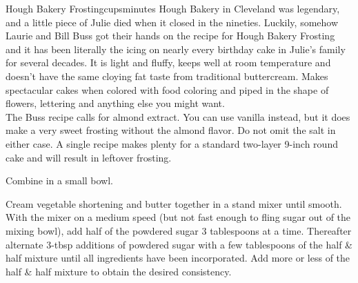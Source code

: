 \begin{recipe}{Hough Bakery Frosting}{\unit[6]{cups}}{\unit[20]{minutes}}
\freeform Hough Bakery in Cleveland was legendary, and a little piece
of Julie died when it closed in the nineties. Luckily, somehow Laurie
and Bill Buss got their hands on the recipe for Hough Bakery Frosting
and it has been literally the icing on nearly every birthday cake in
Julie's family for several decades. It is light and fluffy, keeps well
at room temperature and doesn't have the same cloying fat taste from
traditional buttercream. Makes spectacular cakes when colored with
food coloring and piped in the shape of flowers, lettering and
anything else you might want.\\

The Buss recipe calls for almond extract. You can use vanilla instead, but it does make a very sweet frosting without the almond flavor. Do not omit the salt in either case. A single recipe makes plenty for a standard two-layer 9-inch round cake and will result in leftover frosting.

Combine in a small bowl.

Cream vegetable shortening and butter together in a stand mixer until
smooth. With the mixer on a medium speed (but not fast enough to fling
sugar out of the mixing bowl), add half of the powdered sugar 3
tablespoons at a time. Thereafter alternate 3-tbsp additions of
powdered sugar with a few tablespoons of the half \& half mixture
until all ingredients have been incorporated. Add more or less of the
half \& half mixture to obtain the desired consistency.
\end{recipe}
